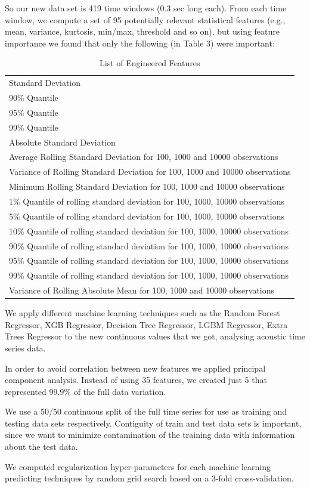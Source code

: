 \documentclass[]{llncs} %
\begin{document}
So our new data set is 419 time windows (0.3 sec long each).  From each time window, we compute a set of 95 potentially relevant statistical features (e.g., mean, variance, kurtosis, min/max, threshold and so on), but using feature importance we found that only the following (in Table 3) were important:
\begin{table}[H]
	\begin{center}
		\caption{List of Engineered Features}
		\label{tab:engineeredFeatrures}
		\begin{tabular}{l} 
Standard Deviation \\
90\% Quantile \\
95\% Quantile \\
99\% Quantile \\
Absolute Standard Deviation \\
Average Rolling Standard Deviation for 100, 1000 and 10000 observations \\
Variance of Rolling Standard Deviation for 100, 1000 and 10000 observations \\
Minimum Rolling Standard Deviation for 100, 1000 and 10000 observations \\
1\% Quantile of rolling standard deviation for 100, 1000, 10000 observations \\
5\% Quantile of rolling standard deviation for 100, 1000, 10000 observations \\
10\% Quantile of rolling standard deviation for 100, 1000, 10000 observations \\
90\% Quantile of rolling standard deviation for 100, 1000, 10000 observations \\
95\% Quantile of rolling standard deviation for 100, 1000, 10000 observations \\
99\% Quantile of rolling standard deviation for 100, 1000, 10000 observations \\
Variance of Rolling Absolute Mean for 100, 1000 and 10000 observations \\
		\end{tabular}
	\end{center}
\end{table}

We apply different machine learning techniques such as the Random Forest Regressor, XGB Regressor,  Decision Tree Regressor, LGBM Regressor, Extra Trees Regressor to the new continuous values that we got, analysing acoustic time series data. \par
In order to avoid correlation between new features we applied principal component analysis.  Instead of using 35 features, we created just 5 that represented 99.9\% of the full data variation. \par
We use a 50/50 continuous split of the full time series for use as training and testing data sets respectively. Contiguity of train and test data sets is important, since we want to minimize contamination of the training data with information about the test data. \par
We computed regularization hyper-parameters for each machine learning predicting techniques by random grid search based on a 3-fold cross-validation.
\clearpage
\newpage
\end{document}
